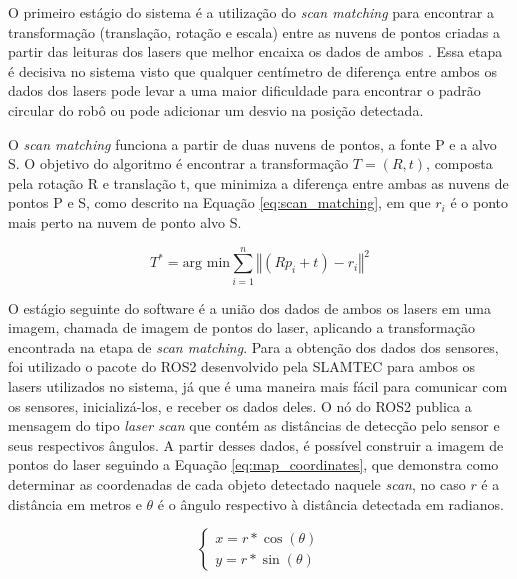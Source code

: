 \documentclass[acronym, symbols, table]{fei}
\begin{document}
				O primeiro estágio do sistema é a utilização do \textit{scan matching} para encontrar a transformação (translação, rotação e escala) entre as nuvens de pontos criadas a partir das leituras dos lasers que melhor encaixa os dados de ambos \cite{NIETO200739}. Essa etapa é decisiva no sistema visto que qualquer centímetro de diferença entre ambos os dados dos lasers pode levar a uma maior dificuldade para encontrar o padrão circular do robô ou pode adicionar um desvio na posição detectada.
								
				O \textit{scan matching} funciona a partir de duas nuvens de pontos, a fonte P e a alvo S. O objetivo do algoritmo é encontrar a transformação $T = (R, t)$, composta pela rotação R e translação t, que minimiza a diferença entre ambas as nuvens de pontos P e S, como descrito na Equação \eqref{eq:scan_matching}, em que $r_i$ é o ponto mais perto na nuvem de ponto alvo S.
				
				\begin{equation} \label{eq:scan_matching}
					T^* = \text{arg min} \sum_{i=1}^{n}\left\Vert (Rp_i + t) - r_i \right\Vert^2
				\end{equation}
			
				O estágio seguinte do software é a união dos dados de ambos os lasers em uma imagem, chamada de imagem de pontos do laser, aplicando a transformação encontrada na etapa de \textit{scan matching}. Para a obtenção dos dados dos sensores, foi utilizado o pacote do ROS2 desenvolvido pela SLAMTEC para ambos os lasers utilizados no sistema, já que é uma maneira mais fácil para comunicar com os sensores, inicializá-los, e receber os dados deles. O nó do ROS2 publica a mensagem do tipo \textit{laser scan} que contém as distâncias de detecção pelo sensor e seus respectivos ângulos. A partir desses dados, é possível construir a imagem de pontos do laser seguindo a Equação \eqref{eq:map_coordinates}, que demonstra como determinar as coordenadas de cada objeto detectado naquele \textit{scan}, no caso $r$ é a distância em metros e $\theta$ é o ângulo respectivo à distância detectada em radianos.
				
				\begin{equation}\label{eq:map_coordinates}
					\begin{cases}
						x = r * \cos(\theta) \\
						y = r * \sin(\theta)
					\end{cases}
				\end{equation}
			
\end{document}
